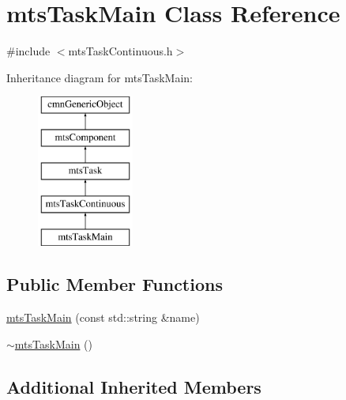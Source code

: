 \hypertarget{classmts_task_main}{\section{mts\-Task\-Main Class Reference}
\label{classmts_task_main}
}


{\ttfamily \#include $<$mts\-Task\-Continuous.\-h$>$}

Inheritance diagram for mts\-Task\-Main\-:\begin{figure}[H]
\begin{center}
\leavevmode
\includegraphics[height=5.000000cm]{d6/dfb/classmts_task_main}
\end{center}
\end{figure}
\subsection*{Public Member Functions}
\begin{DoxyCompactItemize}
\item 
\hyperlink{classmts_task_main_ae5c9e9b141ee64a85bc01e76112e8133}{mts\-Task\-Main} (const std\-::string \&name)
\item 
\hyperlink{classmts_task_main_ab7fe9b0afb46bd95dbeabf198ba17c42}{$\sim$mts\-Task\-Main} ()
\end{DoxyCompactItemize}
\subsection*{Additional Inherited Members}


